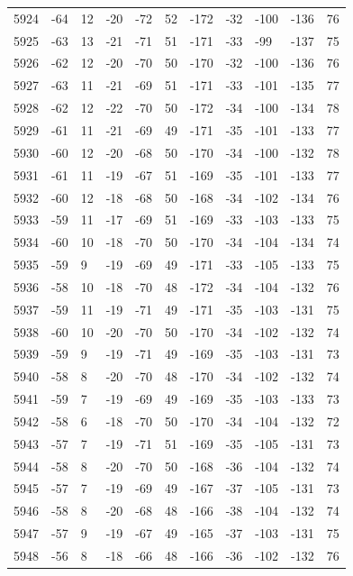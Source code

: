 \begin{table}[H]
\begin{tabular}{lllllllllll}
5924 & -64 & 12 & -20 & -72 & 52 & -172 & -32 & -100 & -136 & 76 \\
5925 & -63 & 13 & -21 & -71 & 51 & -171 & -33 & -99 & -137 & 75 \\
5926 & -62 & 12 & -20 & -70 & 50 & -170 & -32 & -100 & -136 & 76 \\
5927 & -63 & 11 & -21 & -69 & 51 & -171 & -33 & -101 & -135 & 77 \\
5928 & -62 & 12 & -22 & -70 & 50 & -172 & -34 & -100 & -134 & 78 \\
5929 & -61 & 11 & -21 & -69 & 49 & -171 & -35 & -101 & -133 & 77 \\
5930 & -60 & 12 & -20 & -68 & 50 & -170 & -34 & -100 & -132 & 78 \\
5931 & -61 & 11 & -19 & -67 & 51 & -169 & -35 & -101 & -133 & 77 \\
5932 & -60 & 12 & -18 & -68 & 50 & -168 & -34 & -102 & -134 & 76 \\
5933 & -59 & 11 & -17 & -69 & 51 & -169 & -33 & -103 & -133 & 75 \\
5934 & -60 & 10 & -18 & -70 & 50 & -170 & -34 & -104 & -134 & 74 \\
5935 & -59 & 9 & -19 & -69 & 49 & -171 & -33 & -105 & -133 & 75 \\
5936 & -58 & 10 & -18 & -70 & 48 & -172 & -34 & -104 & -132 & 76 \\
5937 & -59 & 11 & -19 & -71 & 49 & -171 & -35 & -103 & -131 & 75 \\
5938 & -60 & 10 & -20 & -70 & 50 & -170 & -34 & -102 & -132 & 74 \\
5939 & -59 & 9 & -19 & -71 & 49 & -169 & -35 & -103 & -131 & 73 \\
5940 & -58 & 8 & -20 & -70 & 48 & -170 & -34 & -102 & -132 & 74 \\
5941 & -59 & 7 & -19 & -69 & 49 & -169 & -35 & -103 & -133 & 73 \\
5942 & -58 & 6 & -18 & -70 & 50 & -170 & -34 & -104 & -132 & 72 \\
5943 & -57 & 7 & -19 & -71 & 51 & -169 & -35 & -105 & -131 & 73 \\
5944 & -58 & 8 & -20 & -70 & 50 & -168 & -36 & -104 & -132 & 74 \\
5945 & -57 & 7 & -19 & -69 & 49 & -167 & -37 & -105 & -131 & 73 \\
5946 & -58 & 8 & -20 & -68 & 48 & -166 & -38 & -104 & -132 & 74 \\
5947 & -57 & 9 & -19 & -67 & 49 & -165 & -37 & -103 & -131 & 75 \\
5948 & -56 & 8 & -18 & -66 & 48 & -166 & -36 & -102 & -132 & 76 \\

\end{tabular}
\end{table}
